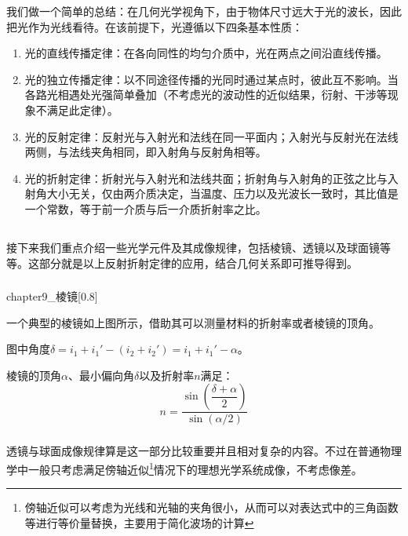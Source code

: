 我们做一个简单的总结：在几何光学视角下，由于物体尺寸远大于光的波长，因此把光作为光线看待。在该前提下，光遵循以下四条基本性质：
\begin{enumerate}
    \item 光的直线传播定律：在各向同性的均匀介质中，光在两点之间沿直线传播。
    \item 光的独立传播定律：以不同途径传播的光同时通过某点时，彼此互不影响。当各路光相遇处光强简单叠加（不考虑光的波动性的近似结果，衍射、干涉等现象不满足此定律）。
    \item 光的反射定律：反射光与入射光和法线在同一平面内；入射光与反射光在法线两侧，与法线夹角相同，即入射角与反射角相等。
    \item 光的折射定律：折射光与入射光和法线共面；折射角与入射角的正弦之比与入射角大小无关，仅由两介质决定，当温度、压力以及光波长一致时，其比值是一个常数，等于前一介质与后一介质折射率之比。
\end{enumerate}
\subsection[光学元件的成像规律]{}
接下来我们重点介绍一些光学元件及其成像规律，包括棱镜、透镜以及球面镜等等。这部分就是以上反射折射定律的应用，结合几何关系即可推导得到。

\subsubsection[棱镜]{}
\begin{singlefigure}[棱镜]{chapter9_棱镜}[0.8]
\end{singlefigure}

一个典型的棱镜如上图所示，借助其可以测量材料的折射率或者棱镜的顶角。

图中角度$\delta = i_1 + i_1' - (i_2 + i_2') = i_1 + i_1' - \alpha$。
\begin{law}
    棱镜的顶角$\alpha$、最小偏向角$\delta$以及折射率$n$满足：
    \[n = \dfrac{\sin(\dfrac{\delta + \alpha}{2})}{\sin(\alpha/2)}\]
\end{law}

\subsubsection[透镜与球面成像]{}
透镜与球面成像规律算是这一部分比较重要并且相对复杂的内容。不过在普通物理学中一般只考虑满足傍轴近似\footnote{傍轴近似可以考虑为光线和光轴的夹角很小，从而可以对表达式中的三角函数等进行等价量替换，主要用于简化波场的计算}情况下的理想光学系统成像，不考虑像差。


